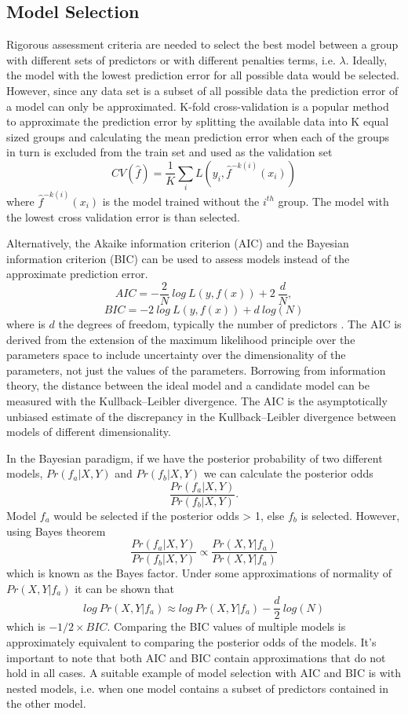 \documentclass[../main.tex]{subfiles}
\begin{document}
\subsection{Model Selection}

Rigorous assessment criteria are needed to select the best model between a group with different sets of predictors or with different penalties terms, i.e. $\lambda$.
Ideally, the model with the lowest prediction error for all possible data would be selected.
However, since any data set is a subset of all possible data the prediction error of a model can only be approximated.
K-fold cross-validation is a popular method to approximate the prediction error by splitting the available data into K equal sized groups and calculating the mean prediction error when each of the groups in turn is excluded from the train set and used as the validation set
$$CV(\hat{f})=\frac{1}{K}\sum_iL(y_i,\hat{f}^{-k(i)}(x_i))$$
where $\hat{f}^{-k(i)}(x_i)$ is the model trained without the $i^{th}$ group.
The model with the lowest cross validation error is than selected.

Alternatively, the Akaike information criterion (AIC) and the Bayesian information criterion (BIC) can be used to assess models instead of the approximate prediction error.
$$AIC = -\frac{2}{N}\ log\ L(y,f(x)) + 2\ \frac{d}{N},$$
$$BIC = -2\ log\ L(y,f(x))  + d\ log(N)$$
where is $d$ the degrees of freedom, typically the number of predictors \parencite{Schwarz1978,Akaike1971}.
The AIC is derived from the extension of the maximum likelihood principle over the parameters space to include uncertainty over the dimensionality of the parameters, not just the values of the parameters.
Borrowing from information theory, the distance between the ideal model and a candidate model can be measured with the Kullback–Leibler divergence.
The AIC is the asymptotically unbiased estimate of the discrepancy in the Kullback–Leibler divergence between models of different dimensionality.

In the Bayesian paradigm, if we have the posterior probability of two different models, $Pr(f_a|X,Y)$ and $Pr(f_b|X,Y)$ we can calculate the posterior odds 
$$\frac{Pr(f_a|X,Y)}{Pr(f_b|X,Y)}.$$
Model $f_a$ would be selected if the posterior odds > 1, else $f_b$ is selected. 
However, using Bayes theorem
$$\frac{Pr(f_a|X,Y)}{Pr(f_b|X,Y)} \propto \frac{Pr(X,Y|f_a)}{Pr(X,Y|f_a)}$$
which is known as the Bayes factor.
Under some approximations of normality of $Pr(X,Y|f_a)$ it can be shown that
$$log\ Pr(X,Y|f_a) \approx log\ Pr(X,Y|f_a) - \frac{d}{2}\ log(N)$$
which is $-1/2 \times BIC$. 
Comparing the BIC values of multiple models is approximately equivalent to comparing the posterior odds of the models.
It's important to note that both AIC and BIC contain approximations that do not hold in all cases.
A suitable example of model selection with AIC and BIC is with nested models, i.e. when one model contains a subset of predictors contained in the other model.
\end{document}
